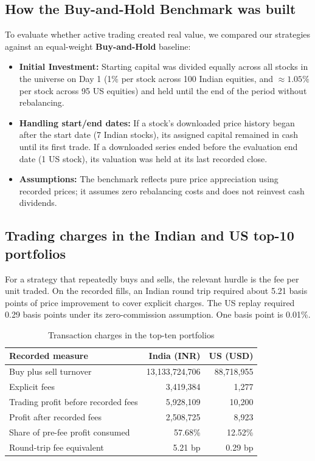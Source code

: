 \documentclass[12pt,a4paper,twoside,openany]{report}
\begin{document}
\subsection*{How the Buy-and-Hold Benchmark was built}
To evaluate whether active trading created real value, we compared our strategies against an equal-weight \textbf{Buy-and-Hold} baseline:
\begin{itemize}
  \item \textbf{Initial Investment:} Starting capital was divided equally across all stocks in the universe on Day 1 (1\% per stock across 100 Indian equities, and $\approx 1.05\%$ per stock across 95 US equities) and held until the end of the period without rebalancing.
  \item \textbf{Handling start/end dates:} If a stock's downloaded price history began after the start date (7 Indian stocks), its assigned capital remained in cash until its first trade. If a downloaded series ended before the evaluation end date (1 US stock), its valuation was held at its last recorded close.
  \item \textbf{Assumptions:} The benchmark reflects pure price appreciation using recorded prices; it assumes zero rebalancing costs and does not reinvest cash dividends.
\end{itemize}


\subsection{Trading charges in the Indian and US top-10 portfolios}\label{exp:9.2}
For a strategy that repeatedly buys and sells, the relevant hurdle is the fee per unit traded. On the recorded fills, an Indian round trip required about 5.21 basis points of price improvement to cover explicit charges. The US replay required 0.29 basis points under its zero-commission assumption. One basis point is 0.01\%.
\begin{table}[htbp]\centering\singlespacing
\caption{Transaction charges in the top-ten portfolios}
\begin{tabularx}{\linewidth}{@{}Xrr@{}}\toprule
Recorded measure & India (INR) & US (USD)\\\midrule
Buy plus sell turnover & 13,133,724,706 & 88,718,955\\
Explicit fees & 3,419,384 & 1,277\\
Trading profit before recorded fees & 5,928,109 & 10,200\\
Profit after recorded fees & 2,508,725 & 8,923\\
Share of pre-fee profit consumed & 57.68\% & 12.52\%\\
Round-trip fee equivalent & 5.21 bp & 0.29 bp\\\bottomrule
\end{tabularx}
\end{table}
\end{document}
